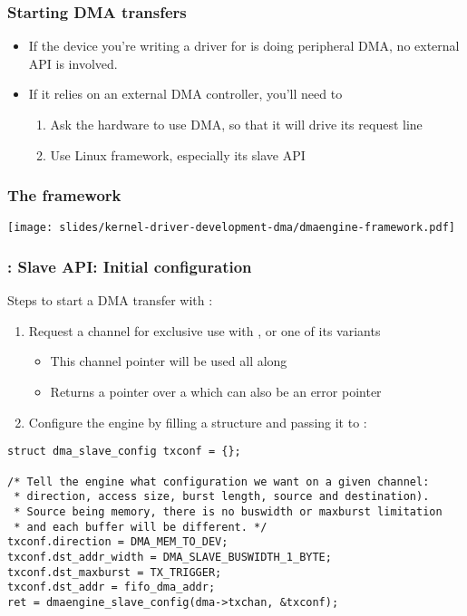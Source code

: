 \begin{frame}
  \frametitle{Starting DMA transfers}
  \begin{itemize}
  \item If the device you're writing a driver for is doing peripheral
    DMA, no external API is involved.
  \item If it relies on an external DMA controller, you'll need to
    \begin{enumerate}
    \item Ask the hardware to use DMA, so that it will drive its
      request line
    \item Use Linux  framework, especially its slave API
    \end{enumerate}
  \end{itemize}
\end{frame}

\begin{frame}[fragile]
  \frametitle{The  framework}
  \begin{center}
    \texttt{[image: slides/kernel-driver-development-dma/dmaengine-framework.pdf]}
  \end{center}
\end{frame}

\begin{frame}[fragile]
  \frametitle{: Slave API: Initial configuration}
  Steps to start a DMA transfer with :
  \begin{enumerate}
  \item Request a channel for exclusive use with
    , or one of its variants
    \begin{itemize}
    \item This channel pointer will be used all along
    \item Returns a pointer over a  which can also
      be an error pointer
    \end{itemize}
  \item Configure the engine by filling a 
    structure and passing it to :
  \end{enumerate}
\begin{verbatim}
struct dma_slave_config txconf = {};

/* Tell the engine what configuration we want on a given channel:
 * direction, access size, burst length, source and destination).
 * Source being memory, there is no buswidth or maxburst limitation
 * and each buffer will be different. */
txconf.direction = DMA_MEM_TO_DEV;
txconf.dst_addr_width = DMA_SLAVE_BUSWIDTH_1_BYTE;
txconf.dst_maxburst = TX_TRIGGER;
txconf.dst_addr = fifo_dma_addr;
ret = dmaengine_slave_config(dma->txchan, &txconf);
\end{verbatim}
\end{frame}

